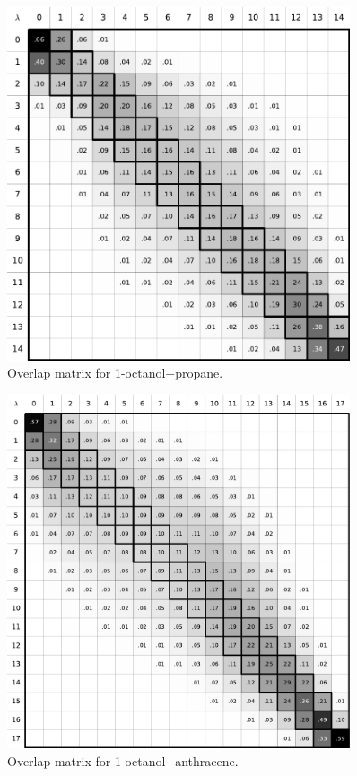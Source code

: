 \documentclass[
	12pt,				%
	openany,			%
	oneside,			%
	a4paper,			%
	english,			%
	brazil				%
	]{abntex2}
\begin{document}
\begin{apendicesenv}
\begin{figure}[H]
	\centering
	\includegraphics[width=0.9\textwidth]{Figures/ooct_prop}
	\caption{Overlap matrix for 1-octanol+propane.}
\end{figure}

\begin{figure}[H]
	\centering
	\includegraphics[width=0.9\textwidth]{Figures/ooct_ant}
	\caption{Overlap matrix for 1-octanol+anthracene.}
\end{figure}


\end{apendicesenv}
\end{document}
